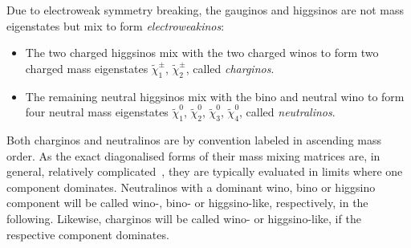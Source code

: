 Due to electroweak symmetry breaking, the gauginos and higgsinos are not mass eigenstates but mix to form \textit{electroweakinos}: 
\begin{itemize}
	\item The two charged higgsinos mix with the two charged winos to form two charged mass eigenstates $\tilde{\chi}_1^\pm$, $\tilde{\chi}_2^\pm$, called \textit{charginos}.
	\item The remaining neutral higgsinos mix with the bino and neutral wino to form four neutral mass eigenstates $\tilde{\chi}_1^0$, $\tilde{\chi}_2^0$, $\tilde{\chi}_3^0$, $\tilde{\chi}_4^0$, called \textit{neutralinos}.
\end{itemize}
Both charginos and neutralinos are by convention labeled in ascending mass order. As the exact diagonalised forms of their mass mixing matrices are, in general, relatively complicated~\cite{Choi:2001ww}, they are typically evaluated in limits where one component dominates. Neutralinos with a dominant wino, bino or higgsino component will be called wino-, bino- or higgsino-like, respectively, in the following. Likewise, charginos will be called wino- or higgsino-like, if the respective component dominates.
